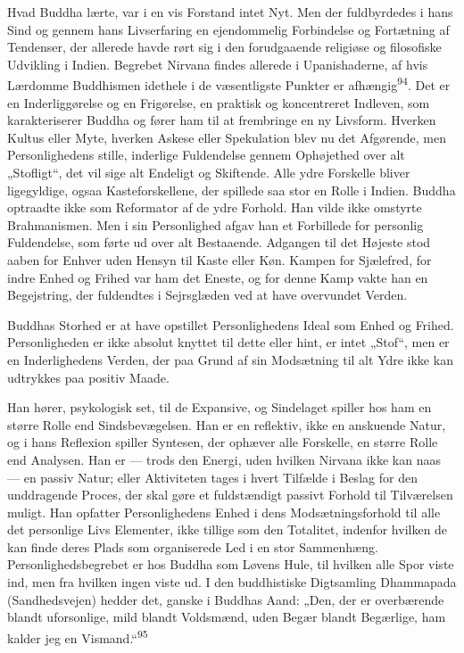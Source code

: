 \documentclass[12pt,a4paper,openany]{book}
\newcommand{\opage}[1]{\marginnote{\footnotesize\textit{[#1]}}}
\begin{document}
Hvad Buddha lærte, var i en vis Forstand intet Nyt. Men der fuldbyrdedes
i hans Sind og gennem hans Livserfaring en ejendommelig Forbindelse og
Fortætning af Tendenser, der allerede havde rørt sig i den forudgaaende
religiøse og filosofiske Udvikling i Indien. Begrebet Nirvana findes
allerede i Upanishaderne, af hvis Lærdomme Buddhismen idethele i de
væsentligste Punkter er afhængig\textsuperscript{94}. Det er en
Inderliggørelse og en Frigørelse, en praktisk og koncentreret Indleven,
som karakteriserer Buddha og fører ham til at frembringe en ny Livsform.
Hverken Kultus eller Myte, hverken Askese eller Spekulation blev nu det
Afgørende, men Personlighedens stille, inderlige Fuldendelse gennem
Ophøjethed over alt „Stofligt“, det vil sige alt Endeligt og Skiftende.
Alle ydre Forskelle bliver ligegyldige, ogsaa Kasteforskellene, der
spillede saa stor en Rolle i Indien. Buddha optraadte ikke som
Reformator af de ydre Forhold. Han vilde ikke omstyrte Brahmanismen. Men
i sin Personlighed afgav han et Forbillede for personlig Fuldendelse,
som førte ud over alt Bestaaende. Adgangen til det Højeste stod aaben
for Enhver uden Hensyn til Kaste eller Køn. Kampen for Sjælefred, for
indre Enhed og Frihed var ham det Eneste, og for denne Kamp vakte han en
Begejstring, der fuldendtes i Sejrsglæden ved at have overvundet Verden.

Buddhas Storhed er at have opstillet Personlighedens Ideal som Enhed og
Frihed. Personligheden er ikke absolut knyttet til dette eller hint, er
intet „Stof“, men er en Inderlighedens Verden, der paa Grund af sin
Modsætning til alt Ydre ikke kan udtrykkes paa positiv Maade.

\opage{196}Han hører, psykologisk set, til de Expansive, og Sindelaget
spiller hos ham en større Rolle end Sindsbevægelsen. Han er en
reflektiv, ikke en anskuende Natur, og i hans Reflexion spiller
Syntesen, der ophæver alle Forskelle, en større Rolle end Analysen. Han
er --- trods den Energi, uden hvilken Nirvana ikke kan naas --- en
passiv Natur; eller Aktiviteten tages i hvert Tilfælde i Beslag for den
unddragende Proces, der skal gøre et fuldstændigt passivt Forhold til
Tilværelsen muligt. Han opfatter Personlighedens Enhed i dens
Modsætningsforhold til alle det personlige Livs Elementer, ikke tillige
som den Totalitet, indenfor hvilken de kan finde deres Plads som
organiserede Led i en stor Sammenhæng. Personlighedsbegrebet er hos
Buddha som Løvens Hule, til hvilken alle Spor viste ind, men fra hvilken
ingen viste ud. I den buddhistiske Digtsamling Dhammapada
(Sandhedsvejen) hedder det, ganske i Buddhas Aand: „Den, der er
overbærende blandt uforsonlige, mild blandt Voldsmænd, uden Begær blandt
Begærlige, ham kalder jeg en Vismand.“\textsuperscript{95}
\end{document}
